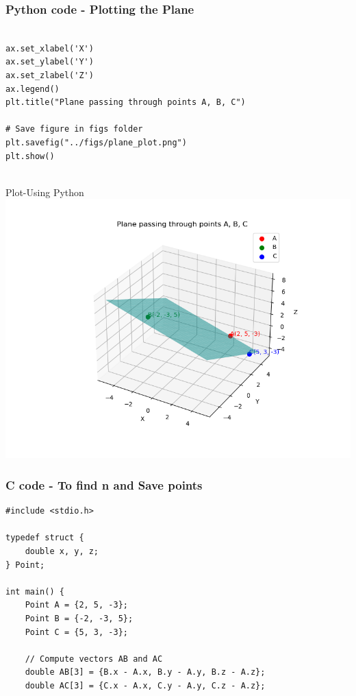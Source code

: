 \documentclass{beamer}
\begin{document}
\begin{frame}[fragile]                            
\frametitle{Python code - Plotting the Plane}                
\begin{lstlisting}

ax.set_xlabel('X')
ax.set_ylabel('Y')
ax.set_zlabel('Z')
ax.legend()
plt.title("Plane passing through points A, B, C")

# Save figure in figs folder
plt.savefig("../figs/plane_plot.png")
plt.show()


\end{lstlisting}

\end{frame}
\begin{frame}{Plot-Using  Python}
    \centering
    \includegraphics[width=\columnwidth, height=0.8\textheight, keepaspectratio]{../figs/plane_plot.png}     
\end{frame}


\begin{frame}[fragile]                            
\frametitle{C code - To find n  and Save points}                
\begin{lstlisting}
#include <stdio.h>

typedef struct {
    double x, y, z;
} Point;

int main() {
    Point A = {2, 5, -3};
    Point B = {-2, -3, 5};
    Point C = {5, 3, -3};

    // Compute vectors AB and AC
    double AB[3] = {B.x - A.x, B.y - A.y, B.z - A.z};
    double AC[3] = {C.x - A.x, C.y - A.y, C.z - A.z};
\end{lstlisting}
\end{frame}
\end{document}
